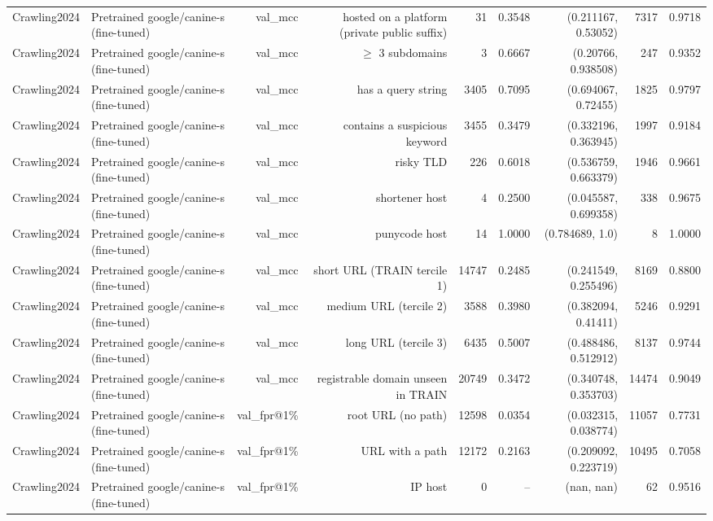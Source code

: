 \begin{table}[t]
\begin{tabular}{llrrrrrrr}
Crawling2024 & Pretrained google/canine-s (fine-tuned) & val\_mcc & hosted on a platform (private public suffix) & 31 & 0.3548 & (0.211167, 0.53052) & 7317 & 0.9718 \\
Crawling2024 & Pretrained google/canine-s (fine-tuned) & val\_mcc & $\geq$ 3 subdomains & 3 & 0.6667 & (0.20766, 0.938508) & 247 & 0.9352 \\
Crawling2024 & Pretrained google/canine-s (fine-tuned) & val\_mcc & has a query string & 3405 & 0.7095 & (0.694067, 0.72455) & 1825 & 0.9797 \\
Crawling2024 & Pretrained google/canine-s (fine-tuned) & val\_mcc & contains a suspicious keyword & 3455 & 0.3479 & (0.332196, 0.363945) & 1997 & 0.9184 \\
Crawling2024 & Pretrained google/canine-s (fine-tuned) & val\_mcc & risky TLD & 226 & 0.6018 & (0.536759, 0.663379) & 1946 & 0.9661 \\
Crawling2024 & Pretrained google/canine-s (fine-tuned) & val\_mcc & shortener host & 4 & 0.2500 & (0.045587, 0.699358) & 338 & 0.9675 \\
Crawling2024 & Pretrained google/canine-s (fine-tuned) & val\_mcc & punycode host & 14 & 1.0000 & (0.784689, 1.0) & 8 & 1.0000 \\
Crawling2024 & Pretrained google/canine-s (fine-tuned) & val\_mcc & short URL (TRAIN tercile 1) & 14747 & 0.2485 & (0.241549, 0.255496) & 8169 & 0.8800 \\
Crawling2024 & Pretrained google/canine-s (fine-tuned) & val\_mcc & medium URL (tercile 2) & 3588 & 0.3980 & (0.382094, 0.41411) & 5246 & 0.9291 \\
Crawling2024 & Pretrained google/canine-s (fine-tuned) & val\_mcc & long URL (tercile 3) & 6435 & 0.5007 & (0.488486, 0.512912) & 8137 & 0.9744 \\
Crawling2024 & Pretrained google/canine-s (fine-tuned) & val\_mcc & registrable domain unseen in TRAIN & 20749 & 0.3472 & (0.340748, 0.353703) & 14474 & 0.9049 \\
Crawling2024 & Pretrained google/canine-s (fine-tuned) & val\_fpr@1\% & root URL (no path) & 12598 & 0.0354 & (0.032315, 0.038774) & 11057 & 0.7731 \\
Crawling2024 & Pretrained google/canine-s (fine-tuned) & val\_fpr@1\% & URL with a path & 12172 & 0.2163 & (0.209092, 0.223719) & 10495 & 0.7058 \\
Crawling2024 & Pretrained google/canine-s (fine-tuned) & val\_fpr@1\% & IP host & 0 & -- & (nan, nan) & 62 & 0.9516 \\

\end{tabular}
\end{table}
